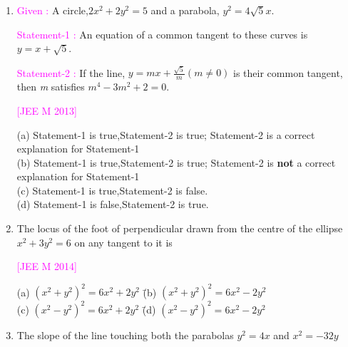 \documentclass[journal,12pt,twocolumn]{IEEEtran}
\theoremstyle{remark}
\begin{document}
\begin{enumerate}[label=\textcolor{magenta}{\arabic*.}]
    \begin{tabbing}
        (a) $x^2+y^2-6y-7=0$ \hspace{0em} \= (b) $x^2+y^2-6y+7=0$ \\
        (c) $x^2+y^2-6y-5=0$ \hspace{0em} \= (d) $x^2+y^2-6y+5=0$ \\
    \end{tabbing}
    \item
    \textcolor{magenta}{Given : }A circle,$2x^2+2y^2=5$ and a parabola, $y^2=4\sqrt{5}x$.
    
    \textcolor{magenta}{Statement-1 :} An equation of a common tangent to these curves is $y=x+\sqrt{5}$.
    
    \textcolor{magenta}{Statement-2 :} If the line, $y=mx+\frac{\sqrt{5}}{m} (m\neq0)$ is their common tangent, then \textit{m} satisfies $m^4-3m^2+2=0$.

    \hfill{\textcolor{magenta}{[JEE M 2013]}}
    
    (a) Statement-1 is true,Statement-2 is true; Statement-2
    is a correct explanation for Statement-1\\
    (b) Statement-1 is true,Statement-2 is true; Statement-2
    is \textbf{not} a correct explanation for Statement-1\\
    (c) Statement-1 is true,Statement-2 is false.\\
    (d) Statement-1 is false,Statement-2 is true.\\
    \item The locus of the foot of perpendicular drawn from the centre of the ellipse $x^2+3y^2=6$ on any tangent to it is
    
    \hfill{\textcolor{magenta}{[JEE M 2014]}}
    
    \begin{tabbing}
        (a) $(x^2+y^2)^2=6x^2+2y^2$ \hspace{0em} \= (b) $(x^2+y^2)^2=6x^2-2y^2$ \\
        (c) $(x^2-y^2)^2=6x^2+2y^2$ \hspace{0em} \= (d) $(x^2-y^2)^2=6x^2-2y^2$ \\
    \end{tabbing}

    \newpage
    \item The slope of the line touching both the parabolas $y^2=4x$ and $x^2=-32y$


\end{enumerate}
\end{document}
